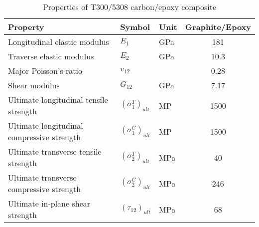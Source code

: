 \begin{table*}[!ht]
\caption{Properties of T300/5308 carbon/epoxy composite}
\label{tab:T300/5308}
\begin{adjustbox}{width=1\textwidth}
\centering
\begin{tabularx}{0.8\textwidth}{p{}p{}p{}c}
	\toprule
	\textbf{Property}								   & \textbf{Symbol}				  & \textbf{Unit}  & \textbf{ Graphite/Epoxy}     \\
	\midrule
	Longitudinal elastic modulus			   & $E_1$				  & GPa   &  181                 \\
	Traverse elastic modulus				   & $E_2$				  & GPa   &  10.3                \\
	Major Poisson's ratio					   & $v_{12}$			  &       &  0.28                \\
	Shear modulus							   & $G_{12}$			  & GPa   &  7.17                \\
	Ultimate longitudinal tensile strength     & $(\sigma_1^T)_{ult}$ & MP    &  1500                 \\
	Ultimate longitudinal compressive strength & $(\sigma_1^C)_{ult}$ & MP    &  1500                 \\
	Ultimate transverse tensile strength       & $(\sigma_2^T)_{ult}$ & MPa   &  40                   \\
	Ultimate transverse compressive strength   & $(\sigma_2^C)_{ult}$ & MPa   &  246                   \\
	Ultimate in-plane shear strength           & $(\tau_{12})_{ult}$  & MPa   &  68                    \\
	\bottomrule
\end{tabularx}
\end{adjustbox}
\end{table*}

